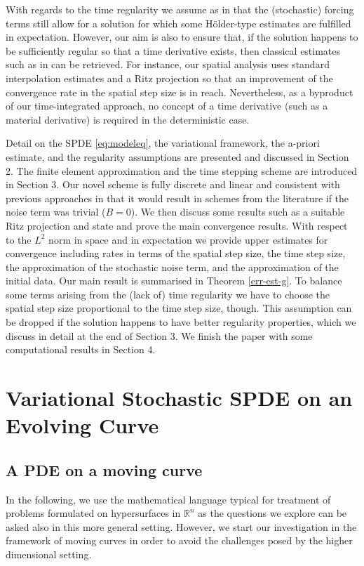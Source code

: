\documentclass[a4paper,10pt]{article}
\newcommand{\R}{\mathbb{R}}
\numberwithin{equation}{section}
\begin{document}
With regards to the time regularity we assume as in \cite{BDE} that the (stochastic) forcing terms still allow for a solution for which some H\"{o}lder-type estimates are fulfilled in expectation. However, our aim is also to ensure that, if the solution happens to be sufficiently regular so that a time derivative exists, then classical estimates such as in \cite{DE07,DE12,DEL2} can be retrieved. For instance, our spatial analysis uses standard interpolation estimates and a Ritz projection so that an improvement of the convergence rate in the spatial step size is in reach. Nevertheless, as a byproduct of our time-integrated approach, no concept of a time derivative (such as a material derivative) is required in the deterministic case.

Detail on the SPDE \eqref{eq:modeleq}, the variational framework, the a-priori estimate, and the regularity assumptions are presented and discussed in Section 2. The finite element approximation and the time stepping scheme are introduced in Section 3. Our novel scheme is fully discrete and linear and consistent with previous approaches in that it would result in schemes from the literature if the noise term was trivial ($B=0$).
We then discuss some results such as a suitable Ritz projection and state and prove the main convergence results. With respect to the $L^2$ norm in space and in expectation we provide upper estimates for convergence including rates in terms of the spatial step size, the time step size, the approximation of the stochastic noise term, and the approximation of the initial data. Our main result is summarised in Theorem \ref{err-est-g}.
To balance some terms arising from the (lack of) time regularity we have to choose the spatial step size proportional to the time step size, though. This assumption can be dropped if the solution happens to have better regularity properties, which we discuss in detail at the end of Section 3.
We finish the paper with some computational results in Section 4.


\section{Variational Stochastic SPDE on an Evolving Curve}

\subsection{A PDE on a moving curve}
In the following, we use the mathematical language typical for treatment of problems formulated on hypersurfaces in $\R^{n}$ as the questions we explore can be asked also in this more general setting. However, we start our investigation in the framework of moving curves in order to avoid the challenges posed by the higher dimensional setting.
\end{document}
